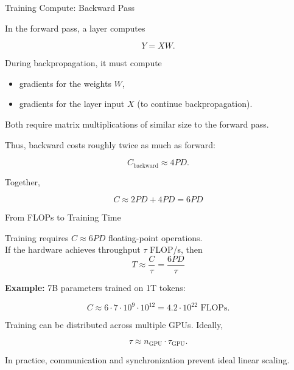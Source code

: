 \documentclass[11pt,compress,t,notes=noshow, xcolor=table]{beamer}
\begin{document}

\begin{vbframe}{Training Compute: Backward Pass}

In the forward pass, a layer computes

\[
Y = XW.
\]

During backpropagation, it must compute

\begin{itemize}
    \item gradients for the weights $W$,
    \item gradients for the layer input $X$
          (to continue backpropagation).
\end{itemize}

Both require matrix multiplications of similar size to the forward pass.

Thus, backward costs roughly twice as much as forward:

\[
C_{\text{backward}} \approx 4PD.
\]

Together,

\[
\boxed{
C \approx 2PD + 4PD = 6PD
}
\]

\end{vbframe}


\begin{vbframe}{From FLOPs to Training Time}

Training requires $C \approx 6PD$ floating-point operations.\\

If the hardware achieves throughput $\tau$ FLOP/s, then 
\[
\boxed{
T \approx \frac{C}{\tau}
=
\frac{6PD}{\tau}
}
\] 


\textbf{Example:} 7B parameters trained on 1T tokens:

\[
C
\approx
6 \cdot 7\cdot10^9 \cdot 10^{12}
=
4.2\cdot10^{22}\text{ FLOPs}.
\]

Training can be distributed across multiple GPUs. Ideally,

\[
\tau
\approx
n_{\text{GPU}}
\cdot
\tau_{\text{GPU}}.
\]

In practice, communication and synchronization prevent ideal linear scaling.

\end{vbframe}


\end{document}
